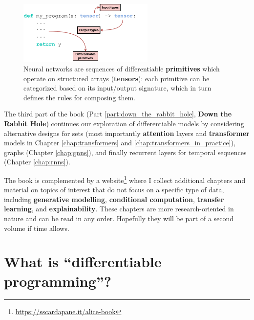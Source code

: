 \begin{figure}
    \centering
    \hspace{1em}\includegraphics[width=0.6\textwidth]{images/differentiable_programming.pdf}
    \caption{Neural networks are sequences of differentiable \textbf{primitives} which operate on structured arrays (\textbf{tensors}): each primitive can be categorized based on its input/output signature, which in turn defines the rules for composing them.}
    \label{fig:differentiable_programming}
\end{figure}

The third part of the book (Part \ref{part:down_the_rabbit_hole}, \textbf{Down the Rabbit Hole}) continues our exploration of differentiable models by considering alternative designs for sets (most importantly \textbf{attention} layers and \textbf{transformer} models in Chapter \ref{chap:transformers} and \ref{chap:transformers_in_practice}), graphs (Chapter \ref{chap:gnns}), and finally recurrent layers for temporal sequences (Chapter \ref{chap:rnns}). 

The book is complemented by a website\footnote{\url{https://sscardapane.it/alice-book}} where I collect additional chapters and material on topics of interest that do not focus on a specific type of data, including \textbf{generative modelling}, \textbf{conditional computation}, \textbf{transfer learning}, and \textbf{explainability}. These chapters are more research-oriented in nature and can be read in any order. Hopefully they will be part of a second volume if time allows.
%
\section*{What is ``differentiable programming''?}

